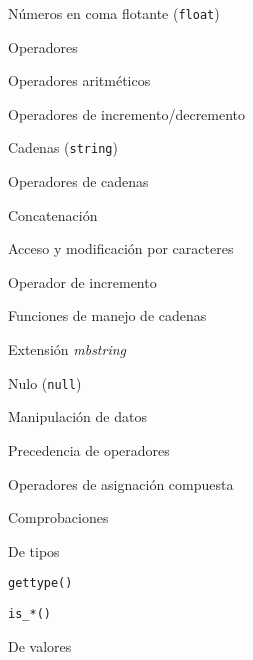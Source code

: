 \begin{longenum}
\begin{longenum}
\begin{longenum}
\begin{longenum}
                \item Números en coma flotante (\texttt{float})
                \item Operadores
                \begin{longenum}
                    \item Operadores aritméticos
                    \item Operadores de incremento/decremento
                \end{longenum}
            \end{longenum}
            \item Cadenas (\texttt{string})
            \begin{longenum}
                \item Operadores de cadenas
                \begin{longenum}
                    \item Concatenación
                    \item Acceso y modificación por caracteres
                    \item Operador de incremento \opcional\
                \end{longenum}
                \item Funciones de manejo de cadenas
                \item Extensión \textit{mbstring}
            \end{longenum}
            \item Nulo (\texttt{null})
        \end{longenum}
        \item Manipulación de datos
        \begin{longenum}
            \item Precedencia de operadores
            \item Operadores de asignación compuesta
            \item Comprobaciones
            \begin{longenum}
                \item De tipos
                \begin{longenum}
                    \item \texttt{gettype()}
                    \item \texttt{is\_*()}
                \end{longenum}
                \item De valores
                \begin{longenum}

\end{longenum}
\end{longenum}
\end{longenum}
\end{longenum}
\end{longenum}
